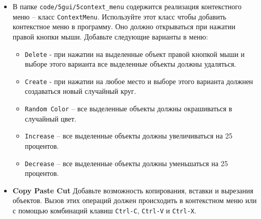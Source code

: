\documentclass{article}
\begin{document}
\begin{itemize}
\item В папке \texttt{code/5gui/5context\_menu} содержится реализация контекстного меню -- класс \texttt{ContextMenu}. Используйте этот класс чтобы добавить контекстное меню в программу. Оно должно открываться при нажатии правой кнопки мыши. Добавьте следующие варианты в меню:
\begin{itemize}
\item \texttt{Delete} - при нажатии на выделенные объект правой кнопкой мыши и выборе этого варианта все выделенные объекты должны удаляться.
\item \texttt{Create} - при нажатии на любое место и выборе этого варианта должнен создаваться новый случайный круг.
\item \texttt{Random Color} -- все выделенные объекты должны окрашиваться в случайный цвет.
\item \texttt{Increase} -- все выделенные объекты должны увеличиваться на 25 процентов.
\item \texttt{Decrease} -- все выделенные объекты должны уменьшаться на 25 процентов.
\end{itemize}

\item \textbf{Copy Paste Cut} Добавьте возможность копирования, вставки и вырезания объектов. Вызов этих операций должен происходить в контекстном меню или с помощью комбинаций клавиш \texttt{Ctrl-C}, \texttt{Ctrl-V} и \texttt{Ctrl-X}.
\end{itemize}
\end{document}
